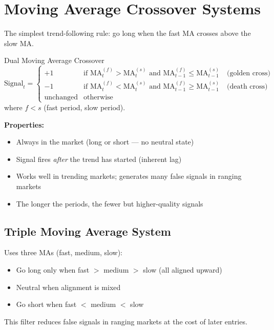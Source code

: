 \documentclass[12pt,a4paper,openany]{report}
\theoremstyle{definition}
\begin{document}
\section{Moving Average Crossover Systems}

The simplest trend-following rule: go long when the fast MA crosses above the slow MA.

\begin{definitionbox}{Dual Moving Average Crossover}
\begin{equation}
  \text{Signal}_t = \begin{cases}
    +1 & \text{if } \text{MA}^{(f)}_t > \text{MA}^{(s)}_t \text{ and } \text{MA}^{(f)}_{t-1} \leq \text{MA}^{(s)}_{t-1} \quad \text{(golden cross)} \\
    -1 & \text{if } \text{MA}^{(f)}_t < \text{MA}^{(s)}_t \text{ and } \text{MA}^{(f)}_{t-1} \geq \text{MA}^{(s)}_{t-1} \quad \text{(death cross)} \\
    \text{unchanged} & \text{otherwise}
  \end{cases}
\end{equation}
where $f < s$ (fast period, slow period).
\end{definitionbox}

\textbf{Properties:}
\begin{itemize}
  \item Always in the market (long or short — no neutral state)
  \item Signal fires \emph{after} the trend has started (inherent lag)
  \item Works well in trending markets; generates many false signals in ranging markets
  \item The longer the periods, the fewer but higher-quality signals
\end{itemize}

\subsection{Triple Moving Average System}

Uses three MAs (fast, medium, slow):
\begin{itemize}
  \item Go long only when fast $>$ medium $>$ slow (all aligned upward)
  \item Neutral when alignment is mixed
  \item Go short when fast $<$ medium $<$ slow
\end{itemize}
This filter reduces false signals in ranging markets at the cost of later entries.
\end{document}

